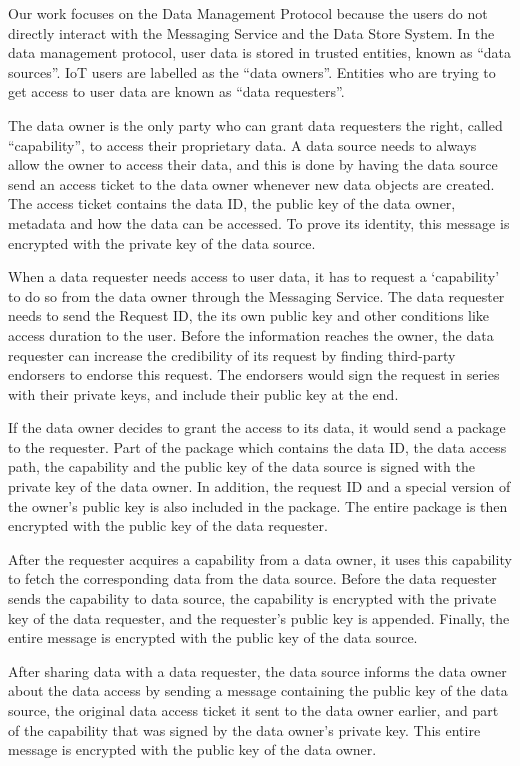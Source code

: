 Our work focuses on the Data Management Protocol because the users do not directly interact with the Messaging Service and the Data Store System. In the data management protocol, user data is stored in trusted entities, known as ``data sources''. IoT users are labelled as the ``data owners''. Entities who are trying to get access to user data are known as ``data requesters''. 

The data owner is the only party who can grant data requesters the right, called ``capability'', to access their proprietary data. A data source needs to always allow the owner to access their data, and this is done by having the data source send an access ticket to the data owner whenever new data objects are created. The access ticket contains the data ID, the public key of the data owner, metadata and how the data can be accessed. To prove its identity, this message is encrypted with the private key of the data source.

When a data requester needs access to user data, it has to request a `capability' to do so from the data owner through the Messaging Service. The data requester needs to send the Request ID, the its own public key and other conditions like access duration to the user. Before the information reaches the owner, the data requester can increase the credibility of its request by finding third-party endorsers to endorse this request. The endorsers would sign the request in series with their private keys, and include their public key at the end.

If the data owner decides to grant the access to its data, it would send a package to the requester. Part of the package which contains the data ID, the data access path, the capability and the public key of the data source is signed with the private key of the data owner. In addition, the request ID and a special version of the owner’s public key is also included in the package. The entire package is then encrypted with the public key of the data requester.

After the requester acquires a capability from a data owner, it uses this capability to fetch the corresponding data from the data source. Before the data requester sends the capability to data source, the capability is encrypted with the private key of the data requester, and the requester’s public key is appended. Finally, the entire message is encrypted with the public key of the data source.

After sharing data with a data requester, the data source informs the data owner about the data access by sending a message containing the public key of the data source, the original data access ticket it sent to the data owner earlier, and part of the capability that was signed by the data owner’s private key. This entire message is encrypted with the public key of the data owner.

